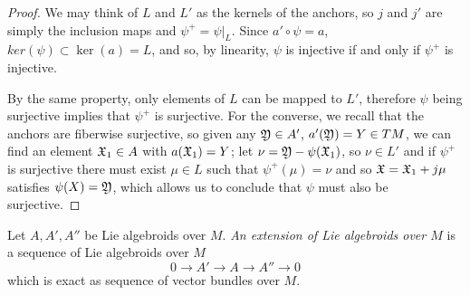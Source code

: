 \begin{proof}
We may think of $L$ and $L'$ as the kernels of the anchors, so $j$ and $j'$ are simply the inclusion maps and $\psi^+ = \psi|_L$. Since $a' \circ \psi = a$, $ker(\psi) \subset \ker(a) = L$, and so, by linearity, $\psi$ is injective if and only if $\psi^+$ is injective.

By the same property, only elements of $L$ can be mapped to $L'$, therefore $\psi$ being surjective implies that $\psi^+$ is surjective. For the converse, we recall that the anchors are fiberwise surjective, so given any $\mathfrak{Y} \in A'$, $a'(\mathfrak{Y}) = Y \in TM$, we can find an element $\mathfrak{X}_1 \in A$ with $a(\mathfrak{X}_1) = Y$; let $\nu = \mathfrak{Y} - \psi(\mathfrak{X}_1)$, so $\nu \in L'$ and if $\psi^+$ is surjective there must exist $\mu \in L$ such that $\psi^+(\mu) = \nu$ and so $\mathfrak{X} = \mathfrak{X}_1 + j\mu$ satisfies $\psi(X) = \mathfrak{Y}$, which allows us to conclude that $\psi$ must also be surjective.
\end{proof}


\linea

\begin{definition} 
Let $A, A', A''$ be Lie algebroids over $M$. \emph{An extension of Lie algebroids over $M$} is a sequence of Lie algebroids over $M$ \[ 0 \to A' \to A \to A'' \to 0 \] which is exact as sequence of vector bundles over $M$.
\end{definition}










